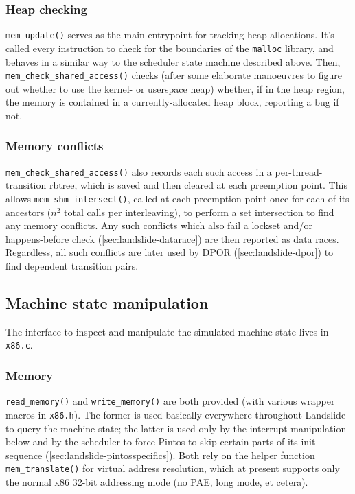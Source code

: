 \subsubsection{Heap checking}
\label{sec:landslide-valgrind-mode}

{\tt mem\_update()} serves as the main entrypoint for tracking heap allocations.
It's called every instruction to check for the boundaries of the {\tt malloc} library,
and behaves in a similar way to the scheduler state machine described above.
Then, {\tt mem\_check\_shared\_access()} checks
(after some elaborate manoeuvres to figure out whether to use the kernel- or userspace heap)
whether, if in the heap region, the memory is contained in a currently-allocated heap block,
reporting a bug if not.

\subsubsection{Memory conflicts}
\label{sec:landslide-shm}

{\tt mem\_check\_shared\_access()} also records each such access in a per-thread-transition rbtree,
which is saved and then cleared at each preemption point.
This allows {\tt mem\_shm\_\allowbreak{}intersect()}, called at each preemption point once for each of its ancestors
($n^2$ total calls per interleaving),
to perform a set intersection to find any memory conflicts.
Any such conflicts which also fail a lockset
and/or happens-before check (\cref{sec:landslide-datarace})
are then reported as data races.
Regardless, all such conflicts are later used by DPOR (\cref{sec:landslide-dpor}) to find dependent transition pairs.


\subsection{Machine state manipulation}

The interface to inspect and manipulate the simulated machine state lives in {\tt x86.c}.

\subsubsection{Memory}

{\tt read\_memory()} and {\tt write\_memory()} are both provided (with various wrapper macros in {\tt x86.h}).
The former is used basically everywhere throughout Landslide to query the machine state;
the latter is used only by the interrupt manipulation below
and by the scheduler to force Pintos to skip certain parts of its init sequence (\cref{sec:landslide-pintosspecifics}).
Both rely on the helper function {\tt mem\_translate()} for virtual address resolution,
which at present supports only the normal x86 32-bit addressing mode (no PAE, long mode, et cetera).

